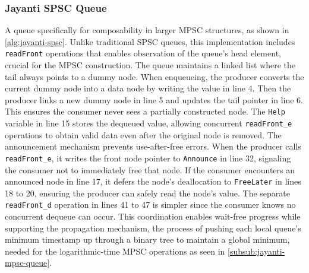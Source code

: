\subsubsection{Jayanti \ac{SPSC} Queue}\label{subsub:jayanti-spsc-queue}
A queue specifically for composability in larger \ac{MPSC} structures, as shown in \cref{alg:jayanti-spsc}. Unlike traditional \ac{SPSC} queues, this implementation includes \texttt{readFront} operations that enables observation of the queue's head element, crucial for the \ac{MPSC} construction. The queue maintains a linked list where the tail always points to a dummy node. When enqueueing, the producer converts the current dummy node into a data node by writing the value in line 4. Then the producer links a new dummy node in line 5 and updates the tail pointer in line 6. This ensures the consumer never sees a partially constructed node. The \texttt{Help} variable in line 15 stores the dequeued value, allowing concurrent \texttt{readFront\_e} operations to obtain valid data even after the original node is removed. The announcement mechanism prevents use-after-free errors. When the producer calls \texttt{readFront\_e}, it writes the front node pointer to \texttt{Announce} in line 32, signaling the consumer not to immediately free that node. If the consumer encounters an announced node in line 17, it defers the node's deallocation to \texttt{FreeLater} in lines 18 to 20, ensuring the producer can safely read the node's value. The separate \texttt{readFront\_d} operation in lines 41 to 47 is simpler since the consumer knows no concurrent dequeue can occur. This coordination enables wait-free progress while supporting the propagation mechanism, the process of pushing each local queue's minimum timestamp up through a binary tree to maintain a global minimum, needed for the logarithmic-time \ac{MPSC} operations as seen in \cref{subsub:jayanti-mpsc-queue}. \cite{JayantiLog}

